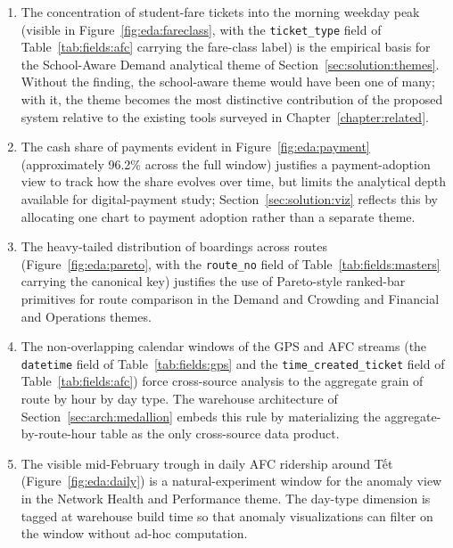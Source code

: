 \begin{enumerate}
\item The concentration of student-fare tickets into the morning weekday peak (visible in Figure~\ref{fig:eda:fareclass}, with the \texttt{ticket\_type} field of Table~\ref{tab:fields:afc} carrying the fare-class label) is the empirical basis for the School-Aware Demand analytical theme of Section~\ref{sec:solution:themes}. Without the finding, the school-aware theme would have been one of many; with it, the theme becomes the most distinctive contribution of the proposed system relative to the existing tools surveyed in Chapter~\ref{chapter:related}.
\item The cash share of payments evident in Figure~\ref{fig:eda:payment} (approximately 96.2\% across the full window) justifies a payment-adoption view to track how the share evolves over time, but limits the analytical depth available for digital-payment study; Section~\ref{sec:solution:viz} reflects this by allocating one chart to payment adoption rather than a separate theme.
\item The heavy-tailed distribution of boardings across routes (Figure~\ref{fig:eda:pareto}, with the \texttt{route\_no} field of Table~\ref{tab:fields:masters} carrying the canonical key) justifies the use of Pareto-style ranked-bar primitives for route comparison in the Demand and Crowding and Financial and Operations themes.
\item The non-overlapping calendar windows of the GPS and AFC streams (the \texttt{datetime} field of Table~\ref{tab:fields:gps} and the \texttt{time\_created\_ticket} field of Table~\ref{tab:fields:afc}) force cross-source analysis to the aggregate grain of route by hour by day type. The warehouse architecture of Section~\ref{sec:arch:medallion} embeds this rule by materializing the aggregate-by-route-hour table as the only cross-source data product.
\item The visible mid-February trough in daily AFC ridership around Tết (Figure~\ref{fig:eda:daily}) is a natural-experiment window for the anomaly view in the Network Health and Performance theme. The day-type dimension is tagged at warehouse build time so that anomaly visualizations can filter on the window without ad-hoc computation.
\end{enumerate}
